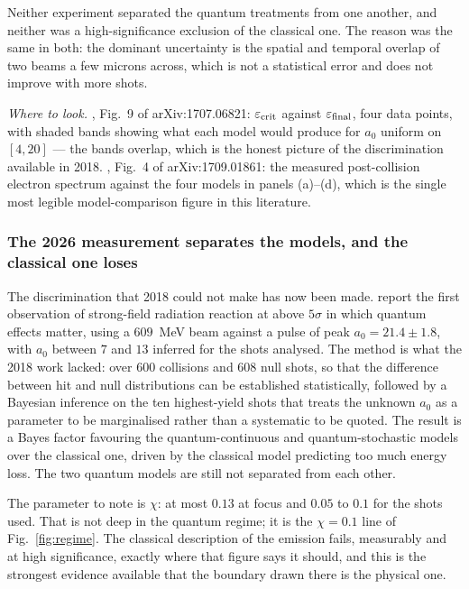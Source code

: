 \documentclass[preprint]{aastex701}
\begin{document}
Neither experiment separated the quantum treatments from one another, and
neither was a high-significance exclusion of the classical one. The reason was
the same in both: the dominant uncertainty is the spatial and temporal overlap
of two beams a few microns across, which is not a statistical error and does
not improve with more shots.

\emph{Where to look.} \citet{cole2018}, Fig.~9 of arXiv:1707.06821:
$\varepsilon_{\rm crit}$ against $\varepsilon_{\rm final}$, four data points,
with shaded bands showing what each model would produce for $a_0$ uniform on
$[4,20]$ --- the bands overlap, which is the honest picture of the
discrimination available in 2018. \citet{poder2018}, Fig.~4 of
arXiv:1709.01861: the measured post-collision electron spectrum against the
four models in panels (a)--(d), which is the single most legible
model-comparison figure in this literature.

\subsubsection{The 2026 measurement separates the models, and the classical one
loses}
\label{sec:los2026}

The discrimination that 2018 could not make has now been made.
\citet{los2026} report the first observation of strong-field radiation reaction
at above $5\sigma$ in which quantum effects matter, using a $609$~MeV beam
against a pulse of peak $a_0=21.4\pm1.8$, with $a_0$ between $7$ and $13$
inferred for the shots analysed. The method is what the 2018 work lacked:
over $600$ collisions and $608$ null shots, so that the difference between hit
and null distributions can be established statistically, followed by a Bayesian
inference on the ten highest-yield shots that treats the unknown $a_0$ as a
parameter to be marginalised rather than a systematic to be quoted. The result
is a Bayes factor favouring the quantum-continuous and quantum-stochastic
models over the classical one, driven by the classical model predicting too
much energy loss. The two quantum models are still not separated from each
other.

The parameter to note is $\chi$: at most $0.13$ at focus and $0.05$ to $0.1$
for the shots used. That is not deep in the quantum regime; it is the
$\chi=0.1$ line of Fig.~\ref{fig:regime}. The classical description of the
emission fails, measurably and at high significance, exactly where that figure
says it should, and this is the strongest evidence available that the boundary
drawn there is the physical one.
\end{document}
